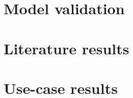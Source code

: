 \section{Model validation}
\label{exp:model_tests}


\section{Literature results}
\label{exp:literature_tests}

\section{Use-case results}
\label{exp:usecase_results}
